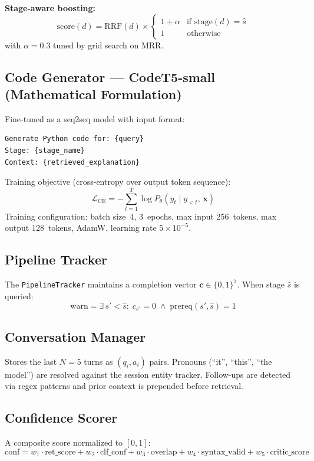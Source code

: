\documentclass[12pt,a4paper]{article}
\begin{document}
\textbf{Stage-aware boosting:}
\[
  \text{score}(d) = \text{RRF}(d)\times
  \begin{cases}
    1+\alpha & \text{if }\mathrm{stage}(d)=\hat{s}\\
    1        & \text{otherwise}
  \end{cases}
\]
with $\alpha=0.3$ tuned by grid search on MRR.

\subsection{Code Generator --- CodeT5-small (Mathematical Formulation)}

Fine-tuned as a seq2seq model with input format:
\begin{lstlisting}[language={}]
Generate Python code for: {query}
Stage: {stage_name}
Context: {retrieved_explanation}
\end{lstlisting}

Training objective (cross-entropy over output token sequence):
\[
  \mathcal{L}_{\text{CE}} = -\sum_{t=1}^{T}\log P_\theta(y_t \mid y_{<t},\,\mathbf{x})
\]
Training configuration: batch size~4, 3~epochs, max input 256~tokens, max output 128~tokens, AdamW, learning rate $5\times10^{-5}$.

\subsection{Pipeline Tracker}

The \texttt{PipelineTracker} maintains a completion vector $\mathbf{c}\in\{0,1\}^7$. When stage $\hat{s}$ is queried:
\[
  \text{warn} = \exists\,s' < \hat{s}:\; c_{s'}=0 \;\wedge\; \text{prereq}(s',\hat{s})=1
\]

\subsection{Conversation Manager}

Stores the last $N=5$ turns as $(q_i,a_i)$ pairs. Pronouns (``it'', ``this'', ``the model'') are resolved against the session entity tracker. Follow-ups are detected via regex patterns and prior context is prepended before retrieval.

\subsection{Confidence Scorer}

A composite score normalized to $[0,1]$:
\[
  \text{conf} = w_1\cdot\text{ret\_score} + w_2\cdot\text{clf\_conf} + w_3\cdot\text{overlap} + w_4\cdot\text{syntax\_valid} + w_5\cdot\text{critic\_score}
\]
\end{document}
